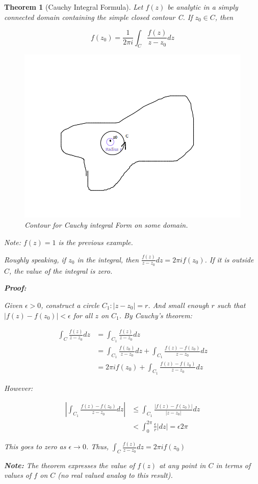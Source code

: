\documentclass{article}
\newtheorem{theorem}{Theorem}[section]
\theoremstyle{definition}
\begin{document}
\begin{theorem}[Cauchy Integral Formula]
	
Let $f(z)$ be analytic in a simply connected domain containing the simple closed contour C. If $z_0 \in C$, then 

$$f(z_0) = \frac{1}{2\pi i}\int_{C} \frac{f(z)}{z-z_0}dz$$

\begin{figure}[H]
	\centering
	\includegraphics[width=0.7\linewidth]{intform}
	\caption{Contour for Cauchy integral Form on some domain.}
	\label{fig:intform}
\end{figure}

Note: $f(z)=1$ is the previous example.

Roughly speaking, if $z_0$ in the integral, then $\frac{f(z)}{z-z_0}dz = 2\pi i f(z_0)$. If it is outside $C$, the value of the integral is zero. 

\textbf{Proof:}

Given $\epsilon>0$, construct a circle $C_1: |z-z_0|=r$. And small enough $r$ such that $|f(z) - f(z_0)|<\epsilon$ for all $z$ on $C_1$. By Cauchy's theorem:

\begin{align}
\int_C \frac{f(z)}{z-z_0}dz &= \int_{C_1} \frac{f(z)}{z-z_0}dz\\ 
& = \int_{C_1} \frac{f(z_0)}{z-z_0}dz +  \int_{C_1} \frac{f(z) - f(z_0)}{z-z_0}dz\\
 & = 2 \pi i f(z_0) +  \int_{C_1} \frac{f(z) - f(z_0)}{z-z_0}dz
\end{align}

However:

\begin{align}
\left|\int_{C_1} \frac{f(z) - f(z_0)}{z-z_0}dz \right| &\leq \int_{C_1} \frac{|f(z) - f(z_0)|}{|z-z_0|}dz \\
&< \int_{0}^{2\pi} \frac{\epsilon}{r} |dz| = \epsilon 2 \pi 
\end{align}

This goes to zero as $\epsilon \to 0$. Thus, $\int_C \frac{f(z)}{z-z_0}dz = 2 \pi i f(z_0)$

\textbf{Note:} The theorem expresses the value of $f(z)$ at any point in $C$ in terms of values of $f$ on $C$ (no real valued analog to this result).
\end{theorem}
\end{document}
